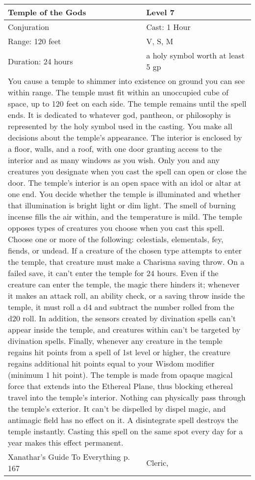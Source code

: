 \documentclass[11pt]{report}
\begin{document}
\begin{table}[H]
	\begin{tabular}{||p{6cm}|p{6cm}||}
		\hline\hline
		\bf{Temple of the Gods} & Level 7\\ \hline
		Conjuration & Cast: 1 Hour\\ \hline
		Range: 120 feet & V, S, M\\ \hline
		Duration: 24 hours & a holy symbol worth at least 5 gp\\ \hline
		\multicolumn{2}{||p{12cm}||}{You cause a temple to shimmer into existence on ground you can see within range. The temple must fit within an unoccupied cube of space, up to 120 feet on each side. The temple remains until the spell ends. It is dedicated to whatever god, pantheon, or philosophy is represented by the holy symbol used in the casting.
You make all decisions about the temple’s appearance. The interior is enclosed by a floor, walls, and a roof, with one door granting access to the interior and as many windows as you wish. Only you and any creatures you designate when you cast the spell can open or close the door.
The temple’s interior is an open space with an idol or altar at one end. You decide whether the temple is illuminated and whether that illumination is bright light or dim light. The smell of burning incense fills the air within, and the temperature is mild.
The temple opposes types of creatures you choose when you cast this spell. Choose one or more of the following: celestials, elementals, fey, fiends, or undead. If a creature of the chosen type attempts to enter the temple, that creature must make a Charisma saving throw. On a failed save, it can’t enter the temple for 24 hours. Even if the creature can enter the temple, the magic there hinders it; whenever it makes an attack roll, an ability check, or a saving throw inside the temple, it must roll a d4 and subtract the number rolled from the d20 roll.
In addition, the sensors created by divination spells can’t appear inside the temple, and creatures within can’t be targeted by divination spells.
Finally, whenever any creature in the temple regains hit points from a spell of 1st level or higher, the creature regains additional hit points equal to your Wisdom modifier (minimum 1 hit point).
The temple is made from opaque magical force that extends into the Ethereal Plane, thus blocking ethereal travel into the temple’s interior. Nothing can physically pass through the temple’s exterior. It can’t be dispelled by dispel magic, and antimagic field has no effect on it. A disintegrate spell destroys the temple instantly.
Casting this spell on the same spot every day for a year makes this effect permanent.}\\ \hline
Xanathar's Guide To Everything p. 167 & Cleric, \\ \hline\hline
	\end{tabular}
\end{table}
\end{document}
